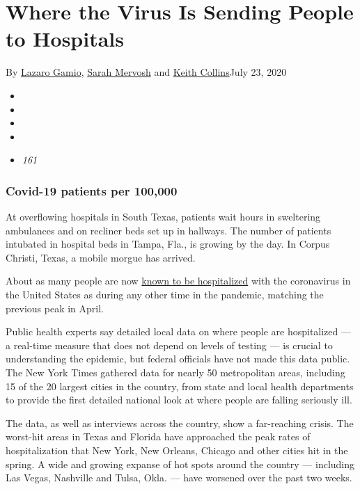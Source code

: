 \hypertarget{where-the-virus-is-sending-people-to-hospitals}{%
\section{Where the Virus Is Sending People to
Hospitals}\label{where-the-virus-is-sending-people-to-hospitals}}

By \href{https://www.nytimes3xbfgragh.onion/by/lazaro-gamio}{Lazaro
Gamio}, \href{https://www.nytimes3xbfgragh.onion/by/sarah-mervosh}{Sarah
Mervosh} and
\href{https://www.nytimes3xbfgragh.onion/by/keith-collins}{Keith
Collins}July 23, 2020

\begin{itemize}
\item
\item
\item
\item
\item
  \emph{161}
\end{itemize}

\hypertarget{covid-19-patients-per-100000}{%
\subsubsection{Covid-19 patients per
100,000}\label{covid-19-patients-per-100000}}

At overflowing hospitals in South Texas, patients wait hours in
sweltering ambulances and on recliner beds set up in hallways. The
number of patients intubated in hospital beds in Tampa, Fla., is growing
by the day. In Corpus Christi, Texas, a mobile morgue has arrived.

About as many people are now
\href{https://covidtracking.com/data/charts/us-currently-hospitalized}{known
to be hospitalized} with the coronavirus in the United States as during
any other time in the pandemic, matching the previous peak in April.

Public health experts say detailed local data on where people are
hospitalized --- a real-time measure that does not depend on levels of
testing --- is crucial to understanding the epidemic, but federal
officials have not made this data public. The New York Times gathered
data for nearly 50 metropolitan areas, including 15 of the 20 largest
cities in the country, from state and local health departments to
provide the first detailed national look at where people are falling
seriously ill.

The data, as well as interviews across the country, show a far-reaching
crisis. The worst-hit areas in Texas and Florida have approached the
peak rates of hospitalization that New York, New Orleans, Chicago and
other cities hit in the spring. A wide and growing expanse of hot spots
around the country --- including Las Vegas, Nashville and Tulsa, Okla.
--- have worsened over the past two weeks.

